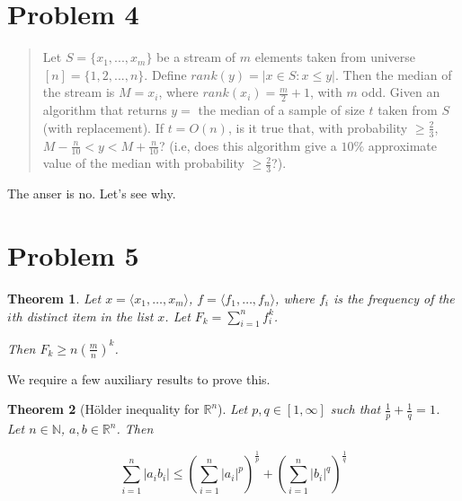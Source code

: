 \documentclass[11pt]{amsart}
\newtheorem{theorem}{Theorem}[section]
\begin{document}
\bigskip
\section*{Problem 4}
\addtocounter{section}{1}
\setcounter{theorem}{0}

\begin{quote}
	Let $S = \{ x_1, ..., x_m \}$ be a stream of $m$ elements taken from universe $[n] = \{1, 2, ..., n \}$. Define $rank(y) = \left| x \in S : x \leq y \right|$. Then the median of the stream is $M = x_i$, where $rank(x_i) = \frac{m}{2} + 1$, with $m$ odd.
	Given an algorithm that returns $y = $ the median of a sample of size $t$ taken from $S$ (with replacement). If $t = O(n)$, is it true that, with probability $\geq \frac{2}{3}$, $M - \frac{n}{10} < y < M + \frac{n}{10}$? (i.e, does this algorithm give a $10\%$ approximate value of the median with probability $\geq \frac{2}{3}$?).
\end{quote}

\bigskip
The anser is no. Let's see why.





\section*{Problem 5}
\addtocounter{section}{1}
\setcounter{theorem}{0}

\begin{theorem}Let $x = \langle x_1, \dots, x_m \rangle$, $f = \langle f_1, \dots, f_n \rangle$, where $f_i$ is the frequency of the $i$th distinct item in the list $x$. Let $F_k = \sum_{i=1}^n f_i^k$.

Then $F_k \ge n \left(\frac{m}{n}\right)^k$.
\end{theorem}

We require a few auxiliary results to prove this.

\begin{theorem}[Hölder inequality for $\mathbb{R}^n$] Let $p, q \in [1, \infty]$ such that $\frac{1}{p} + \frac{1}{q} = 1$. Let $n \in \mathbb{N}$, $a, b \in \mathbb{R}^n$. Then

$$
\sum_{i=1}^n |a_i b_i| \le \left(\sum_{i=1}^n |a_i|^p\right)^{\frac{1}{p}} + \left(\sum_{i=1}^n |b_i|^q\right)^{\frac{1}{q}}
$$
\end{theorem}
\end{document}
